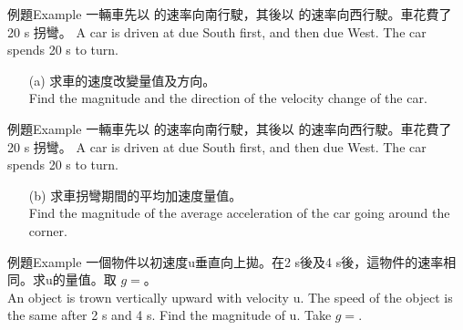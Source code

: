 \documentclass[beamer=true]{standalone}
\begin{document}
\begin{frame}[t]{例題Example}
    一輛車先以  的速率向南行駛，其後以  的速率向西行駛。車花費了 20 s 拐彎。 A car is driven at  due South first, and then  due West. The car spends 20 s to turn.
    \begin{itemize}
        \item [(a)]求車的速度改變量值及方向。 \\Find the magnitude and the direction of the velocity change of the car.
    \end{itemize}
\end{frame}
\begin{frame}[t]{例題Example}
    一輛車先以  的速率向南行駛，其後以  的速率向西行駛。車花費了 20 s 拐彎。 A car is driven at  due South first, and then  due West. The car spends 20 s to turn.
    \begin{itemize}
        \item [(b)]求車拐彎期間的平均加速度量值。 \\Find the magnitude of the average acceleration of the car going around the corner.
    \end{itemize}
\end{frame}
\begin{frame}[t]{例題Example}
    一個物件以初速度u垂直向上拋。在2 s後及4 s後，這物件的速率相同。求u的量值。取 $\mathit{g}=$。 \\An object is trown vertically upward with velocity u. The speed of the object is the same after 2 s and 4 s. Find the magnitude of u. Take $\mathit{g}=$.
\end{frame}
\end{document}
